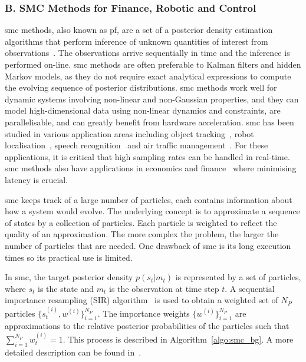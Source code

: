 \subsubsection{B. SMC Methods for Finance, Robotic and Control}
\label{sec:smc}

\gls{smc} methods, also known as \gls{pf}, are a set of a posterior density estimation algorithms that perform inference of unknown quantities of interest from observations~\cite{doucet01}.
The observations arrive sequentially in time and the inference is performed on-line.
\gls{smc} methods are often preferable to Kalman filters and hidden Markov models, as they do not require exact analytical expressions to compute the evolving sequence of posterior distributions.
\gls{smc} methods work well for dynamic systems involving non-linear and non-Gaussian properties, and they can model high-dimensional data using non-linear dynamics and constraints, are parallelisable, and can greatly benefit from hardware acceleration.
\gls{smc} has been studied in various application areas including object tracking~\cite{happe11}, robot localisation~\cite{montemerlo02}, speech recognition~\cite{vermaak02} and air traffic management~\cite{kantas09,eele11}.
For these applications, it is critical that high sampling rates can be handled in real-time.
\gls{smc} methods also have applications in economics and finance~\cite{creal12} where minimising latency is crucial.

\gls{smc} keeps track of a large number of particles, each contains information about how a system would evolve.
The underlying concept is to approximate a sequence of states by a collection of particles.
Each particle is weighted to reflect the quality of an approximation.
The more complex the problem, the larger the number of particles that are needed.
One drawback of \gls{smc} is its long execution times so its practical use is limited.

In \gls{smc}, the target posterior density $p(s_t|m_t)$ is represented by a set of particles, where $s_t$ is the state and $m_t$ is the observation at time step $t$.
A sequential importance resampling (SIR) algorithm~\cite{gordon93} is used to obtain a weighted set of $N_P$ particles $\{s_t^{(i)},w^{(i)}\}^{N_P}_{i=1}$.
The importance weights $\{w^{(i)}\}^{N_P}_{i=1}$ are approximations to the relative posterior probabilities of the particles such that $\sum^{N_P}_{i=1}w^{(i)}_t = 1$.
This process is described in Algorithm~\ref{algo:smc_bg}.
A more detailed description can be found in~\cite{doucet01}. 

